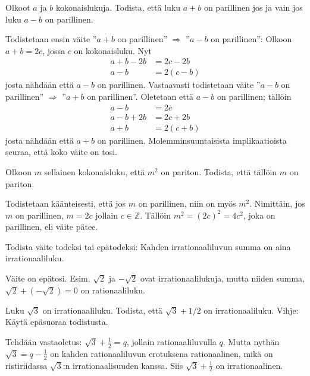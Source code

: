 \begin{tehtavasivu}
	\begin{tehtava}
		Olkoot $a$ ja $b$ kokonaislukuja. Todista, että luku
		$a + b$ on parillinen jos ja vain jos luku
		$a - b$ on parillinen.
		\begin{vastaus}
		Todistetaan ensin väite ''$a + b$ on parillinen'' $\Rightarrow$ ''$a - b$ on parillinen'': Olkoon $a+b = 2c$, jossa $c$ on kokonaisluku. Nyt
		\begin{align*}
		 a+b-2b &= 2c-2b \\
		 a-b &= 2(c-b) 
		\end{align*}
		josta nähdään että $a-b$ on parillinen. Vastaavasti todistetaan väite ''$a - b$ on parillinen'' $\Rightarrow$ ''$a + b$ on parillinen''. Oletetaan että $a-b$ on parillinen; tällöin
		\begin{align*}
		a - b &= 2c \\
		a-b+2b &= 2c + 2b \\
		a+b &= 2(c+b) 
		\end{align*}
		josta nähdään että $a+b$ on parillinen. Molemminsuuntaisista implikaatioista seuraa, että koko väite on tosi. %

		\end{vastaus}
	\end{tehtava}

	\begin{tehtava}
		Olkoon $m$ sellainen kokonaisluku, että $m^2$ on
		pariton. Todista, että tällöin $m$ on pariton.
		\begin{vastaus}
		Todistetaan käänteisesti,  että jos $m$ on parillinen, niin on myös $m^2$. Nimittäin, jos $m$ on parillinen, $m = 2c$ jollain $c \in \mathbb{Z}$. Tällöin $m^2 = (2c)^2 = 4c^2$, joka on parillinen, eli väite pätee.
		\end{vastaus}
	\end{tehtava}

	\begin{tehtava}
		Todista väite todeksi tai epätodeksi: Kahden
		irrationaaliluvun summa on aina irrationaaliluku.
		\begin{vastaus}
			Väite on epätosi. Esim. $\sqrt{2}$ ja $-\sqrt{2}$ ovat irrationaalilukuja, mutta niiden summa, $\sqrt{2} + \left(-\sqrt{2}\right) = 0$ on rationaaliluku.
		\end{vastaus}
	\end{tehtava}

	\begin{tehtava}
		Luku $\sqrt{3}$ on irrationaaliluku. Todista,
		että $\sqrt{3}+1/2$ on irrationaaliluku. Vihje: Käytä
		epäsuoraa todistusta.
		\begin{vastaus}
			Tehdään vastaoletus: $\sqrt{3} + \frac{1}{2} = q$, jollain rationaaliluvulla $q$. Mutta nythän $\sqrt{3} = q - \frac{1}{2}$ on kahden rationaaliluvun erotuksena rationaalinen, mikä on ristiriidassa $\sqrt{3}$:n irrationaalisuuden kanssa. Siis $\sqrt{3} + \frac{1}{2}$ on irrationaalinen.
		\end{vastaus}
	\end{tehtava}


\end{tehtavasivu}
